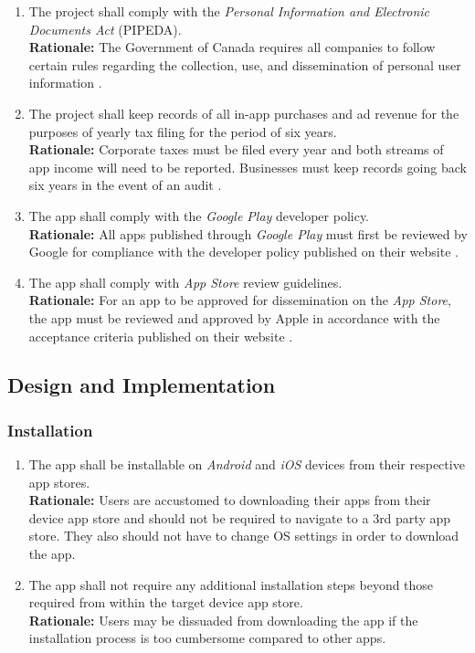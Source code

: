 \documentclass{article}
\begin{document}
\begin{enumerate}[align=left, label=\textbf{CO\arabic*.}]
    \item The project shall comply with the \emph{Personal Information and Electronic Documents Act} (PIPEDA).\\
          {\bf Rationale:} The Government of Canada requires all companies to follow certain rules regarding the collection, use, and dissemination of personal user information \cite{PIPEDA}.
    \item The project shall keep records of all in-app purchases and ad revenue for the purposes of yearly tax filing for the period of six years.\\
          {\bf Rationale:} Corporate taxes must be filed every year and both streams of app income will need to be reported. Businesses must keep records going back six years in the event of an audit \cite{6Year}.
    \item The app shall comply with the \emph{Google Play} developer policy.\\
          {\bf Rationale:} All apps published through \emph{Google Play} must first be reviewed by Google for compliance with the developer policy published on their website \cite{GooglePlay}.
    \item The app shall comply with \emph{App Store} review guidelines.\\
          {\bf Rationale:} For an app to be approved for dissemination on the \emph{App Store}, the app must be reviewed and approved by Apple in accordance with the acceptance criteria published on their website \cite{AppStore}.
\end{enumerate}

\subsection{Design and Implementation}

\subsubsection{Installation}
\label{ssub:installation}


\begin{enumerate}[align=left, label=\textbf{DI-I\arabic*.}]
    \item The app shall be installable on \emph{Android} and \emph{iOS} devices from their respective app stores.\\
          {\bf Rationale:} Users are accustomed to downloading their apps from their device app store and should not be required to navigate to a 3rd party app store. They also should not have to change OS settings in order to download the app.
    \item The app shall not require any additional installation steps beyond those required from within the target device app store.\\
          {\bf Rationale:} Users may be dissuaded from downloading the app if the installation process is too cumbersome compared to other apps.
\end{enumerate}
\end{document}
